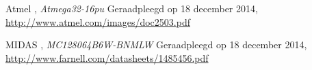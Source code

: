 
	Atmel , \emph{Atmega32-16pu} Geraadpleegd op 18 december 2014, \url{http://www.atmel.com/images/doc2503.pdf}

	MIDAS , \emph{MC128064B6W-BNMLW} Geraadpleegd op 18 december 2014, \url{http://www.farnell.com/datasheets/1485456.pdf}